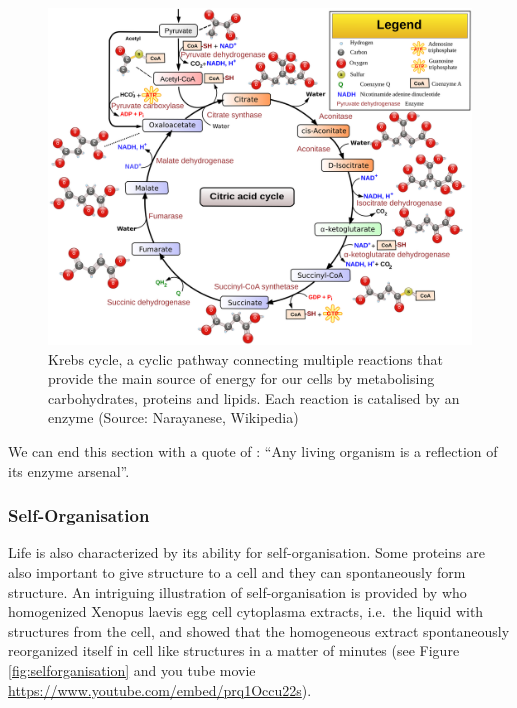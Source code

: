 \documentclass[
  11pt,
]{book}
\begin{document}
\begin{figure}

{\centering \includegraphics[width=0.7\linewidth]{./figs/Citric_acid_cycle_with_aconitate_2} 

}

\caption{Krebs cycle, a cyclic pathway connecting multiple reactions that provide the main source of energy for our cells by metabolising carbohydrates, proteins and lipids. Each reaction is catalised by an enzyme  (Source: Narayanese, Wikipedia)}\label{fig:krebsCycle}
\end{figure}

We can end this section with a quote of \citet{deDuve2002}: ``Any living organism is a reflection of its enzyme arsenal''.

\pagebreak

\hypertarget{self-organisation}{%
\subsubsection{Self-Organisation}\label{self-organisation}}

Life is also characterized by its ability for self-organisation. Some proteins are also important to give structure to a cell and they can spontaneously form structure.
An intriguing illustration of self-organisation is provided by \citet{Cheng2019} who
homogenized Xenopus laevis egg cell cytoplasma extracts, i.e.~the liquid with structures from the cell, and showed that the homogeneous extract spontaneously reorganized itself in cell like structures in a matter of minutes (see Figure \ref{fig:selforganisation} and you tube movie \url{https://www.youtube.com/embed/prq1Occu22s}).
\end{document}
